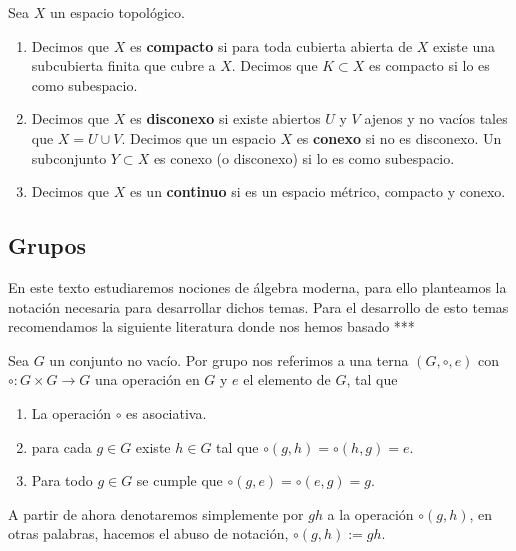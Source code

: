 \begin{df}
Sea $X$ un espacio topológico.

\begin{enumerate}
	\item Decimos que $X$ es \textbf{compacto} si para toda cubierta abierta de $X$ existe una subcubierta finita que cubre a $X$. Decimos que $K \subset X$ es compacto si lo es como subespacio.
	
	\item Decimos que $X$ es \textbf{disconexo} si existe abiertos $U$ y $V$ ajenos y no vacíos tales que $X = U \cup V$. Decimos que un espacio $X$ es \textbf{conexo} si no es disconexo. Un subconjunto $Y \subset X$ es conexo (o disconexo) si lo es como subespacio.
	
	\item Decimos que $X$ es un \textbf{continuo} si es un espacio métrico, compacto y conexo.
\end{enumerate}

\end{df}

\subsection*{Grupos}
En este texto estudiaremos nociones de álgebra moderna, para ello planteamos la notación necesaria para desarrollar dichos temas. Para el desarrollo de esto temas recomendamos la siguiente literatura donde nos hemos basado ***

	\begin{df}
Sea $G$ un conjunto no vacío. Por grupo nos referimos a una terna $(G, \circ, e)$ con $\circ:G \times G \to G$ una operación en $G$ y $e$ el elemento de $G$, tal que

	\begin{enumerate}
		\item La operación $\circ$ es asociativa.
		\item para cada $g \in G$ existe $h \in G$ tal que $ \circ (g,h)= \circ(h ,g)=e$.
		\item Para todo $g \in G$ se cumple que $\circ(g ,e) =  \circ(e,g) = g.$
	\end{enumerate}
	\end{df}

	\begin{cn}
A partir de ahora denotaremos simplemente por $gh$ a la operación $\circ(g,h)$, en otras palabras, hacemos el abuso de notación,  $\circ(g,h):=gh.$
	\end{cn}
	
